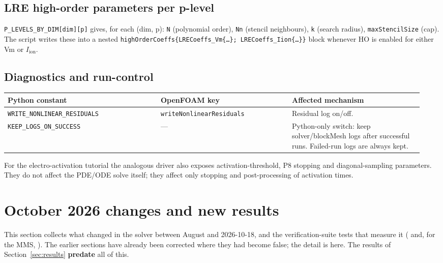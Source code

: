 \documentclass[11pt,a4paper]{article}
\newcommand{\code}[1]{\texttt{\small #1}}
\newcommand{\Iion}{I_{\mathrm{ion}}}
\begin{document}
\subsection{LRE high-order parameters per p-level}
\code{P\_LEVELS\_BY\_DIM[dim][p]} gives, for each (dim, p):
\code{N} (polynomial order), \code{Nn} (stencil neighbours),
\code{k} (search radius), \code{maxStencilSize} (cap). The script
writes these into a nested
\code{highOrderCoeffs\{LRECoeffs\_Vm\{\dots\}; LRECoeffs\_Iion\{\dots\}\}}
block whenever HO is enabled for either Vm or $\Iion$.

\subsection{Diagnostics and run-control}
\begin{longtable}{@{}p{0.35\linewidth}p{0.30\linewidth}p{0.30\linewidth}@{}}
\toprule
Python constant & OpenFOAM key & Affected mechanism \\
\midrule \endhead
\code{WRITE\_NONLINEAR\_RESIDUALS} &
   \code{writeNonlinearResiduals} & Residual log on/off. \\
\code{KEEP\_LOGS\_ON\_SUCCESS} & --- &
   Python-only switch: keep solver/blockMesh logs after successful runs.
   Failed-run logs are always kept. \\
\bottomrule
\end{longtable}

For the electro-activation tutorial the analogous driver also exposes
activation-threshold, P8 stopping and diagonal-sampling parameters. They
do not affect the PDE/ODE solve itself; they affect only stopping and
post-processing of activation times.

\section{October 2026 changes and new results}
\label{sec:oct2026}

This section collects what changed in the solver between August and 2026-10-18,
and the verification-suite tests that measure it
( and, for the
MMS, ). The earlier sections have already
been corrected where they had become false; the detail is here. The results of
Section~\ref{sec:results} \textbf{predate} all of this.
\end{document}

